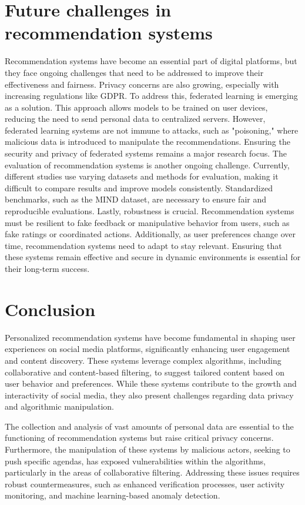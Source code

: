 \documentclass[10pt,twocolumn,twoside,a4paper]{article} %
\begin{document}
\section{Future challenges in recommendation systems} \label{future_challenges}
Recommendation systems have become an essential part of digital platforms, but they face ongoing challenges that need to be addressed to improve their effectiveness and fairness.
Privacy concerns are also growing, especially with increasing regulations like GDPR. To address this, federated learning is emerging as a solution. This approach allows models to be trained on user devices, reducing the need to send personal data to centralized servers. However, federated learning systems are not immune to attacks, such as "poisoning," where malicious data is introduced to manipulate the recommendations. Ensuring the security and privacy of federated systems remains a major research focus. \cite{marcuzzo2022recommendation}
The evaluation of recommendation systems is another ongoing challenge. Currently, different studies use varying datasets and methods for evaluation, making it difficult to compare results and improve models consistently. Standardized benchmarks, such as the MIND dataset, are necessary to ensure fair and reproducible evaluations.
Lastly, robustness is crucial. Recommendation systems must be resilient to fake feedback or manipulative behavior from users, such as fake ratings or coordinated actions. Additionally, as user preferences change over time, recommendation systems need to adapt to stay relevant. Ensuring that these systems remain effective and secure in dynamic environments is essential for their long-term success.

\section{Conclusion} \label{conclusion}
Personalized recommendation systems have become fundamental in shaping user experiences on social media platforms, significantly enhancing user engagement and content discovery. These systems leverage complex algorithms, including collaborative and content-based filtering, to suggest tailored content based on user behavior and preferences. While these systems contribute to the growth and interactivity of social media, they also present challenges regarding data privacy and algorithmic manipulation.

The collection and analysis of vast amounts of personal data are essential to the functioning of recommendation systems but raise critical privacy concerns. Furthermore, the manipulation of these systems by malicious actors, seeking to push specific agendas, has exposed vulnerabilities within the algorithms, particularly in the areas of collaborative filtering. Addressing these issues requires robust countermeasures, such as enhanced verification processes, user activity monitoring, and machine learning-based anomaly detection.
\end{document}
